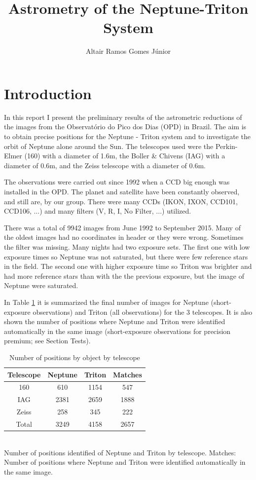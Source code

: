 \documentclass[12pt,a4paper]{report}
\author{Altair Ramos Gomes Júnior}
\title{Astrometry of the Neptune-Triton System}
\newcommand{\PE}{Perkin-Elmer }
\newcommand{\BC}{Boller \& Chivens }
\begin{document}
\maketitle

\pagestyle{headings}

\section*{Introduction}

In this report I present the preliminary results of the astrometric reductions of the images from the Observatório do Pico dos Dias (OPD) in Brazil. The aim is to obtain precise positions for the Neptune - Triton system and to investigate the orbit of Neptune alone around the Sun. The telescopes used were the \PE (160) with a diameter of 1.6m, the \BC (IAG) with a diameter of 0.6m, and the Zeiss telescope with a diameter of 0.6m.

The observations were carried out since 1992 when a CCD big enough was installed in the OPD. The planet and satellite have been constantly observed, and still are, by our group. There were many CCDs (IKON, IXON, CCD101, CCD106, ...) and many filters (V, R, I, No Filter, ...) utilized.

There was a total of 9942 images from June 1992 to September 2015. Many of the oldest images had no coordinates in header or they were wrong. Sometimes the filter was missing. Many nights had two exposure sets. The first one with low exposure times so Neptune was not saturated, but there were few reference stars in the field. The second one with higher exposure time so Triton was brighter and had more reference stars than with the the previous exposure, but the image of Neptune were saturated.

In Table \ref{Tab:dados} it is summarized the final number of images for Neptune (short-exposure observations) and Triton (all observations) for the 3 telescopes. It is also shown the number of positions where Neptune and Triton were identified automatically in the same image (short-exposure observations for precision premium; see Section Tests).

\begin{table}[h]
\centering
\caption{Number of positions by object by telescope}
\label{Tab:dados}
\begin{tabular}{|c|c|c|c|}
\hline 
Telescope & Neptune & Triton & Matches \\ 
\hline
160 & 610 & 1154 & 547 \\ 
\hline 
IAG & 2381 & 2659 & 1888 \\ 
\hline 
Zeiss & 258 & 345 & 222 \\ 
\hline 
Total & 3249 & 4158 & 2657 \\ 
\hline 
\end{tabular}
\\Number of positions identified of Neptune and Triton by telescope. Matches: Number of positions where Neptune and Triton were identified automatically in the same image.
\end{table}
\end{document}
